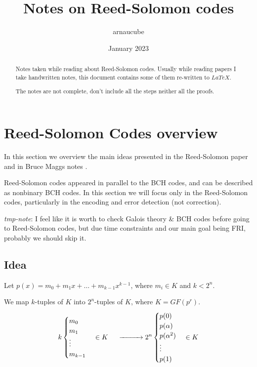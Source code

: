 \documentclass[a4paper]{article}
\title{Notes on Reed-Solomon codes}
\author{arnaucube}
\date{January 2023}
\theoremstyle{definition}
\begin{document}
\maketitle

\begin{abstract}
	Notes taken while reading about Reed-Solomon codes. Usually while reading papers I take handwritten notes, this document contains some of them re-written to $LaTeX$.

	The notes are not complete, don't include all the steps neither all the proofs.
\end{abstract}

\tableofcontents

\section{Reed-Solomon Codes overview}
In this section we overview the main ideas presented in the Reed-Solomon paper \cite{reedsolomon} and in Bruce Maggs notes \cite{reedsolomon-bruce}.

Reed-Solomon codes appeared in parallel to the BCH codes, and can be described as nonbinary BCH codes. In this section we will focus only in the Reed-Solomon codes, particularly in the encoding and error detection (not correction).

\emph{tmp-note}: I feel like it is worth to check Galois theory \& BCH codes before going to Reed-Solomon codes, but due time constraints and our main goal being FRI, probably we should skip it.

\subsection{Idea}

Let $p(x) = m_0 + m_1 x + \ldots + m_{k-1} x^{k-1}$, where $m_i \in K$ and $k < 2^n$.

We map $k$-tuples of $K$ into $2^n$-tuples of $K$, where $K=GF(p^r)$.
$$
k
\begin{cases}
    m_0\\
    m_1\\
    \vdots\\
    m_{k-1}
\end{cases}
\in K~~~~
\xrightarrow{\hspace*{1cm}}
2^n
\begin{cases}
    p(0)\\
    p(\alpha)\\
    p(\alpha^2)\\
    \vdots\\
    p(1)
\end{cases}
\in K
$$
\end{document}
